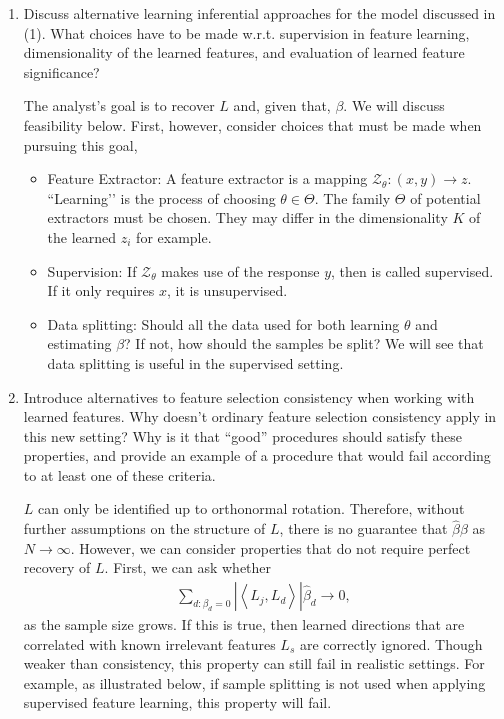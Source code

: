 \documentclass[]{article}
\begin{document}
\begin{enumerate}
\item Discuss alternative learning inferential approaches for the model
discussed in (1). What choices have to be made w.r.t. supervision in feature
learning, dimensionality of the learned features, and evaluation of learned
feature significance?

The analyst’s goal is to recover $L$ and, given that, $\beta$. We will discuss
feasibility below. First, however, consider choices that must be made when
pursuing this goal,
\begin{itemize}
\item Feature Extractor: A feature extractor is a mapping $\mathcal{Z}_{\theta}:
\left(x, y\right) \to z$. ``Learning’’ is the process of choosing $\theta \in
\Theta$. The family $\Theta$ of potential extractors must be chosen. They may
differ in the dimensionality $K$ of the learned $z_i$ for example.
\item Supervision: If $\mathcal{Z}_{\theta}$ makes use of the response $y$, then
is called supervised. If it only requires $x$, it is unsupervised.
\item Data splitting: Should all the data used for both learning $\theta$ and
estimating $\beta$? If not, how should the samples be split? We will see that
data splitting is useful in the supervised setting.
\end{itemize}

\item Introduce alternatives to feature selection consistency when working with
learned features. Why doesn’t ordinary feature selection consistency apply in
this new setting? Why is it that ``good'' procedures should satisfy these
properties, and provide an example of a procedure that would fail according to
at least one of these criteria.

$L$ can only be identified up to orthonormal rotation. Therefore, without
further assumptions on the structure of $L$, there is no guarantee that
$\hat{\beta} \beta$ as $N \to \infty$. However, we can consider properties that
do not require perfect recovery of $L$. First, we can ask whether
\begin{align}
\sum_{d : \beta_{d} = 0} \left|\left< \hat{L}_{j}, L_{d}\right>\right| \hat{\beta}_{d} \to 0,
\end{align}
as the sample size grows. If this is true, then learned directions
that are correlated with known irrelevant features $L_s$ are correctly ignored.
Though weaker than consistency, this property can still fail in realistic
settings. For example, as illustrated below, if sample splitting is not used
when applying supervised feature learning, this property will fail.


\end{enumerate}
\end{document}
